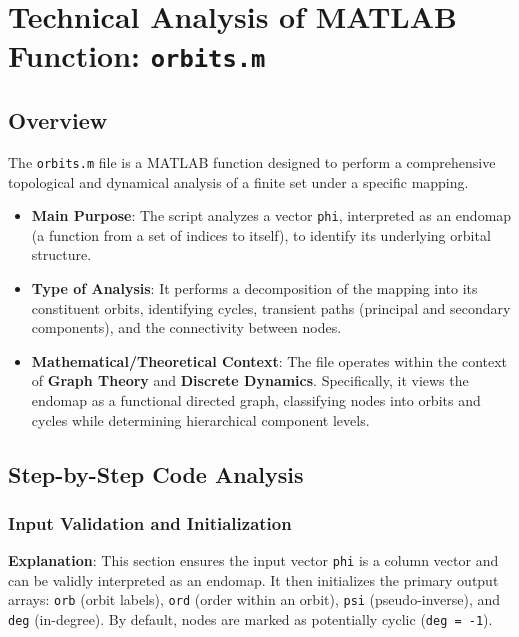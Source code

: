 
\chapter{Technical Analysis of MATLAB Function: \texttt{orbits.m}}
\author{}
\date{}

\maketitle

\section{Overview}

The \texttt{orbits.m} file is a MATLAB function designed to perform a comprehensive topological and dynamical analysis of a finite set under a specific mapping.

\begin{itemize}
    \item \textbf{Main Purpose}: The script analyzes a vector \texttt{phi}, interpreted as an endomap (a function from a set of indices to itself), to identify its underlying orbital structure.
    \item \textbf{Type of Analysis}: It performs a decomposition of the mapping into its constituent orbits, identifying cycles, transient paths (principal and secondary components), and the connectivity between nodes.
    \item \textbf{Mathematical/Theoretical Context}: The file operates within the context of \textbf{Graph Theory} and \textbf{Discrete Dynamics}. Specifically, it views the endomap as a functional directed graph, classifying nodes into orbits and cycles while determining hierarchical component levels.
\end{itemize}



\section{Step-by-Step Code Analysis}

\subsection{Input Validation and Initialization}
\textbf{Explanation}: This section ensures the input vector \texttt{phi} is a column vector and can be validly interpreted as an endomap. It then initializes the primary output arrays: \texttt{orb} (orbit labels), \texttt{ord} (order within an orbit), \texttt{psi} (pseudo-inverse), and \texttt{deg} (in-degree). By default, nodes are marked as potentially cyclic (\texttt{deg = -1}).

